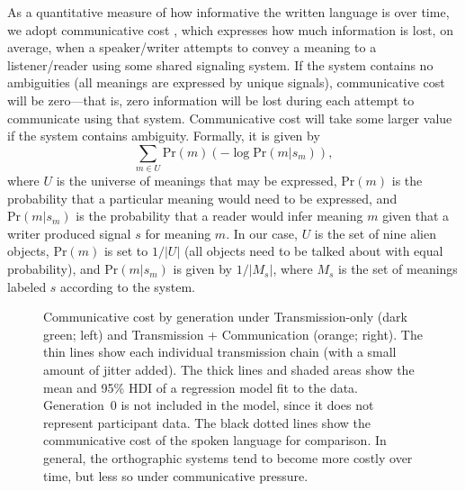 \documentclass[doc,biblatex]{apa7}
\begin{document}
As a quantitative measure of how informative the written language is over time, we adopt communicative cost \parencite{KempRegier:2012, Regier:2015, Kemp:2018}, which expresses how much information is lost, on average, when a speaker/writer attempts to convey a meaning to a listener/reader using some shared signaling system. If the system contains no ambiguities (all meanings are expressed by unique signals), communicative cost will be zero---that is, zero information will be lost during each attempt to communicate using that system. Communicative cost will take some larger value if the system contains ambiguity. Formally, it is given by%
	\begin{equation}
	\sum_{m \in U} \mathrm{Pr}(m) ( -\log \mathrm{Pr}(m|s_m) ),
	\end{equation}
where $U$ is the universe of meanings that may be expressed, $\mathrm{Pr}(m)$ is the probability that a particular meaning would need to be expressed, and $\mathrm{Pr}(m|s_m)$ is the probability that a reader would infer meaning $m$ given that a writer produced signal $s$ for meaning $m$. In our case, $U$ is the set of nine alien objects, $\mathrm{Pr}(m)$ is set to $1/|U|$ (all objects need to be talked about with equal probability), and $\mathrm{Pr}(m|s_m)$ is given by $1/|M_s|$, where $M_s$ is the set of meanings labeled $s$ according to the system.

	\begin{figure}
	\vspace*{2pt}
	\caption{Communicative cost by generation under Transmission-only (dark green; left) and Transmission + Communication (orange; right). The thin lines show each individual transmission chain (with a small amount of jitter added). The thick lines and shaded areas show the mean and 95\% HDI of a regression model fit to the data. Generation~0 is not included in the model, since it does not represent participant data. The black dotted lines show the communicative cost of the spoken language for comparison. In general, the orthographic systems tend to become more costly over time, but less so under communicative pressure.}
	\label{cost_dif}
	\end{figure}
\end{document}
